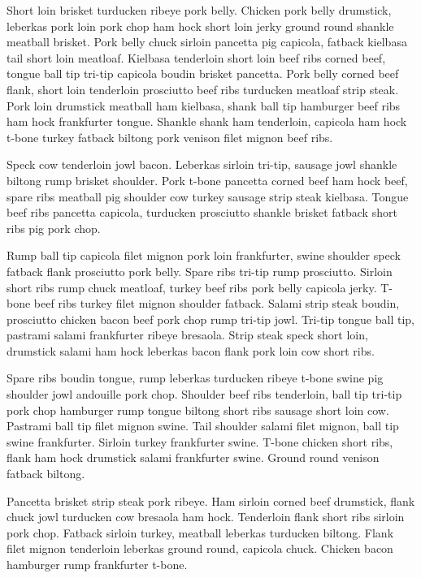 Short loin brisket turducken ribeye pork belly. Chicken pork belly drumstick, leberkas pork loin pork chop ham hock short loin jerky ground round shankle meatball brisket. Pork belly chuck sirloin pancetta pig capicola, fatback kielbasa tail short loin meatloaf. Kielbasa tenderloin short loin beef ribs corned beef, tongue ball tip tri-tip capicola boudin brisket pancetta. Pork belly corned beef flank, short loin tenderloin prosciutto beef ribs turducken meatloaf strip steak. Pork loin drumstick meatball ham kielbasa, shank ball tip hamburger beef ribs ham hock frankfurter tongue. Shankle shank ham tenderloin, capicola ham hock t-bone turkey fatback biltong pork venison filet mignon beef ribs.

Speck cow tenderloin jowl bacon. Leberkas sirloin tri-tip, sausage jowl shankle biltong rump brisket shoulder. Pork t-bone pancetta corned beef ham hock beef, spare ribs meatball pig shoulder cow turkey sausage strip steak kielbasa. Tongue beef ribs pancetta capicola, turducken prosciutto shankle brisket fatback short ribs pig pork chop.

Rump ball tip capicola filet mignon pork loin frankfurter, swine shoulder speck fatback flank prosciutto pork belly. Spare ribs tri-tip rump prosciutto. Sirloin short ribs rump chuck meatloaf, turkey beef ribs pork belly capicola jerky. T-bone beef ribs turkey filet mignon shoulder fatback. Salami strip steak boudin, prosciutto chicken bacon beef pork chop rump tri-tip jowl. Tri-tip tongue ball tip, pastrami salami frankfurter ribeye bresaola. Strip steak speck short loin, drumstick salami ham hock leberkas bacon flank pork loin cow short ribs.

Spare ribs boudin tongue, rump leberkas turducken ribeye t-bone swine pig shoulder jowl andouille pork chop. Shoulder beef ribs tenderloin, ball tip tri-tip pork chop hamburger rump tongue biltong short ribs sausage short loin cow. Pastrami ball tip filet mignon swine. Tail shoulder salami filet mignon, ball tip swine frankfurter. Sirloin turkey frankfurter swine. T-bone chicken short ribs, flank ham hock drumstick salami frankfurter swine. Ground round venison fatback biltong.

Pancetta brisket strip steak pork ribeye. Ham sirloin corned beef drumstick, flank chuck jowl turducken cow bresaola ham hock. Tenderloin flank short ribs sirloin pork chop. Fatback sirloin turkey, meatball leberkas turducken biltong. Flank filet mignon tenderloin leberkas ground round, capicola chuck. Chicken bacon hamburger rump frankfurter t-bone.

